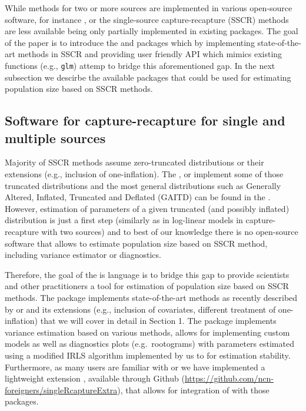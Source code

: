 \documentclass[
]{jss}
\newcommand{\1}{\mathcal{I}} \newcommand{\bZero}{\boldsymbol{0}}
\begin{document}
While methods for two or more sources are implemented in various
open-source software, for instance 
\citep{baillargeon2007rcapture},  \citep{laake2013marked} or
 \citep{yee2015vgam} the single-source capture-recapture
(SSCR) methods are less available being only partially implemented in
existing  packages. The goal of the paper is to introduce
the  and  packages which by
implementing state-of-the-art methods in SSCR and providing user
friendly API which mimics existing  functions (e.g.,
\texttt{glm}) attemp to bridge this aforementioned gap. In the next
subsection we descirbe the available  packages that could be
used for estimating population size based on SSCR methods.

\subsection{Software for capture-recapture for single and multiple
sources}\label{sec-software}

Majority of SSCR methods assume zero-truncated distributions or their
extensions (e.g., inclusion of one-inflation). The 
\citep{countreg},  \citep{VGAM-main} or 
\citep{distributions3} implement some of those truncated distributions
and the most general distributions such as Generally Altered, Inflated,
Truncated and Deflated (GAITD) can be found in the . However,
estimation of parameters of a given truncated (and possibly inflated)
distribution is just a first step (similarly as in log-linear models in
capture-recapture with two sources) and to best of our knowledge there
is no open-source software that allows to estimate population size based
on SSCR method, including variance estimator or diagnostics.

Therefore, the goal of the  is  language
is to bridge this gap to provide scientists and other practitioners a
tool for estimation of population size based on SSCR methods. The
package implements state-of-the-art methods as recently described by
\citet{bohning2018capture} or \citet{bohning2024one} and its extensions
(e.g., inclusion of covariates, different treatment of one-inflation)
that we will cover in detail in Section 1. The package implements
variance estimation based on various methods, allows for implementing
custom models as well as diagnostics plots (e.g.~rootograms) with
parameters estimated using a modified IRLS algorithm implemented by us
to for estimation stability. Furthermore, as many  users are
familiar with  or  we have implemented a
lightweight extension , available through
Github (\url{https://github.com/ncn-foreigners/singleRcaptureExtra}),
that allows for integration of  with those packages.
\end{document}
